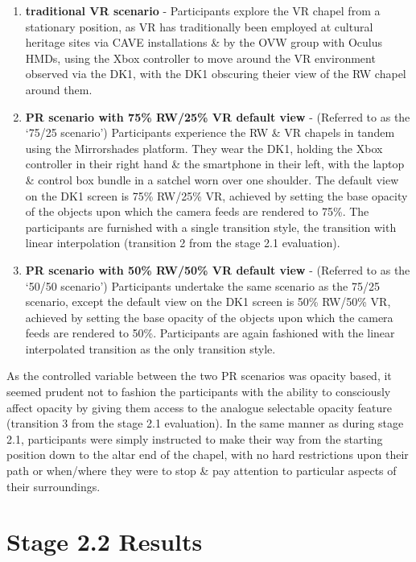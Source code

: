 \begin{enumerate}
	\item \textbf{traditional VR scenario} - Participants explore the VR chapel from a stationary position, as VR has traditionally been employed at cultural heritage sites via CAVE installations \& by the OVW group with Oculus HMDs, using the Xbox controller to move around the VR environment observed via the DK1, with the DK1 obscuring theier view of the RW chapel around them.
	\item \textbf{PR scenario with 75\% RW/25\% VR default view} - (Referred to as the `75/25 scenario') Participants experience the RW \& VR chapels in tandem using the Mirrorshades platform. They wear the DK1, holding the Xbox controller in their right hand \& the smartphone in their left, with the laptop \& control box bundle in a satchel worn over one shoulder. The default view on the DK1 screen is 75\% RW/25\% VR, achieved by setting the base opacity of the objects upon which the camera feeds are rendered to 75\%. The participants are furnished with a single transition style, the transition with linear interpolation (transition 2 from the stage 2.1 evaluation).
	\item \textbf{PR scenario with 50\% RW/50\% VR default view} - (Referred to as the `50/50 scenario') Participants undertake the same scenario as the 75/25 scenario, except the default view on the DK1 screen is 50\% RW/50\% VR, achieved by setting the base opacity of the objects upon which the camera feeds are rendered to 50\%. Participants are again fashioned with the linear interpolated transition as the only transition style.
\end{enumerate}

As the controlled variable between the two PR scenarios was opacity based, it seemed prudent not to fashion the participants with the ability to consciously affect opacity by giving them access to the analogue selectable opacity feature (transition 3 from the stage 2.1 evaluation). In the same manner as during stage 2.1, participants were simply instructed to make their way from the starting position down to the altar end of the chapel, with no hard restrictions upon their path or when/where they were to stop \& pay attention to particular aspects of their surroundings.


\section{Stage 2.2 Results}

